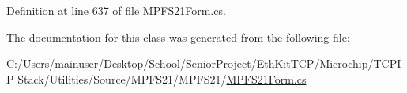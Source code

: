 Definition at line 637 of file M\+P\+F\+S21\+Form.\+cs.



The documentation for this class was generated from the following file\+:\begin{DoxyCompactItemize}
\item 
C\+:/\+Users/mainuser/\+Desktop/\+School/\+Senior\+Project/\+Eth\+Kit\+T\+C\+P/\+Microchip/\+T\+C\+P\+I\+P Stack/\+Utilities/\+Source/\+M\+P\+F\+S21/\+M\+P\+F\+S21/\hyperlink{_m_p_f_s21_form_8cs}{M\+P\+F\+S21\+Form.\+cs}\end{DoxyCompactItemize}
